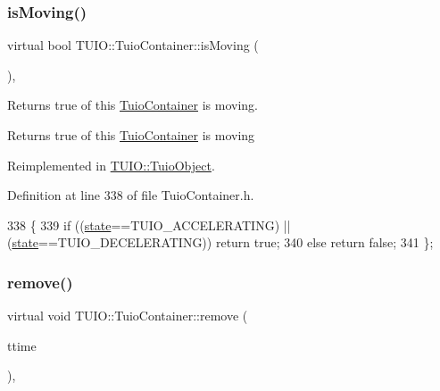 \subsubsection{\texorpdfstring{is\+Moving()}{isMoving()}}
{\footnotesize\ttfamily virtual bool T\+U\+I\+O\+::\+Tuio\+Container\+::is\+Moving (\begin{DoxyParamCaption}{ }\end{DoxyParamCaption})\hspace{0.3cm}{\ttfamily [inline]}, {\ttfamily [virtual]}}

Returns true of this \hyperlink{class_t_u_i_o_1_1_tuio_container}{Tuio\+Container} is moving. \begin{DoxyReturn}{Returns}
true of this \hyperlink{class_t_u_i_o_1_1_tuio_container}{Tuio\+Container} is moving 
\end{DoxyReturn}


Reimplemented in \hyperlink{class_t_u_i_o_1_1_tuio_object_a9239541cb79607ed7a08b2c924655a7b}{T\+U\+I\+O\+::\+Tuio\+Object}.



Definition at line 338 of file Tuio\+Container.\+h.


\begin{DoxyCode}
338                                 \{ 
339             \textcolor{keywordflow}{if} ((\hyperlink{class_t_u_i_o_1_1_tuio_container_a61cfc66997d3d2f2a503e20bd29ddbf1}{state}==TUIO\_ACCELERATING) || (\hyperlink{class_t_u_i_o_1_1_tuio_container_a61cfc66997d3d2f2a503e20bd29ddbf1}{state}==TUIO\_DECELERATING)) \textcolor{keywordflow}{return} \textcolor{keyword}{true};
340             \textcolor{keywordflow}{else} \textcolor{keywordflow}{return} \textcolor{keyword}{false};
341         \};
\end{DoxyCode}
\mbox{\label{class_t_u_i_o_1_1_tuio_container_add021522fdc99f2b85d6f9b1903a427e}} 
\subsubsection{\texorpdfstring{remove()}{remove()}}
{\footnotesize\ttfamily virtual void T\+U\+I\+O\+::\+Tuio\+Container\+::remove (\begin{DoxyParamCaption}\item[{\hyperlink{class_t_u_i_o_1_1_tuio_time}{Tuio\+Time}}]{ttime }\end{DoxyParamCaption})\hspace{0.3cm}{\ttfamily [inline]}, {\ttfamily [virtual]}}

